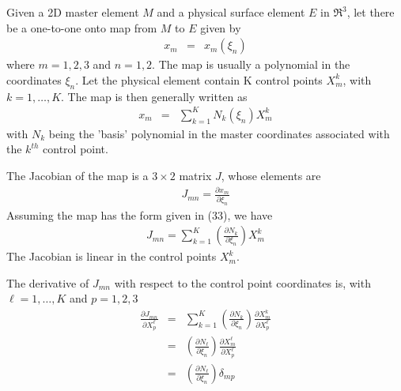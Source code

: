 \documentclass{report}
\begin{document}
 \newline
Given a 2D master element $M$ and a physical surface element 
$E$ in $\Re^3$, let there be a one-to-one onto map from $M$ to $E$ given by 
\begin{eqnarray}
x_m & = & x_m ( \xi_n )
\end{eqnarray}
where $m = 1, 2, 3$ and $n = 1, 2$.  The map is usually a polynomial
in the coordinates $\xi_n$.  Let the physical element contain K control 
points $X_m^k$, with $k=1,\ldots,K$. The map is then generally written as 
\begin{eqnarray}
x_m & = & \sum_{k=1}^K N_k (\xi_n) X_m^k
\end{eqnarray}
with $N_k$ being the 'basis' polynomial in the master coordinates associated
with the $k^{th}$ control point. \newline

 \newline
The Jacobian of the map is a $3 \times 2$ matrix
$J$, whose elements are
\begin{eqnarray}
J_{mn} = \frac{\partial x_m}{\partial \xi_n} 
\end{eqnarray}
Assuming the map has the form given in (33), we have
\begin{eqnarray}
J_{mn} = \sum_{k=1}^K \left( \frac{\partial N_k}{\partial \xi_n} \right) X_m^k 
\end{eqnarray}
The Jacobian is linear in the control points $X_m^k$. \newline

\noindent The derivative of $J_{mn}$ with respect to the control point 
coordinates is, with $\ell=1,\ldots,K$ and $p=1,2,3$
\begin{eqnarray}
\frac{\partial J_{mn}}{\partial X_p^\ell} & = &  \sum_{k=1}^K \left( \frac{\partial N_k}{\partial \xi_n} \right) \frac{\partial X_m^k}{\partial X_p^\ell} \\
  & = &  \left( \frac{\partial N_\ell}{\partial \xi_n} \right) \frac{\partial X_m^\ell}{\partial X_p^\ell} \\
  & = &  \left( \frac{\partial N_\ell}{\partial \xi_n} \right) \delta_{m p}
\end{eqnarray}
\end{document}
